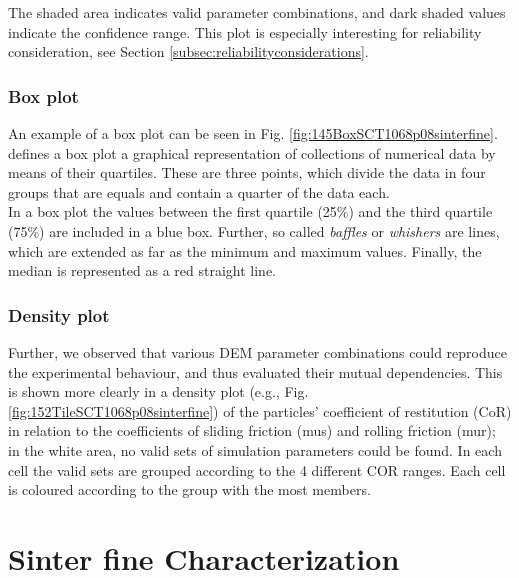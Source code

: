 The shaded area indicates valid parameter combinations, and dark shaded
values indicate the confidence range.
This plot is especially interesting for reliability consideration, see Section
\ref{subsec:reliabilityconsiderations}.




\subsubsection{Box plot}
\label{subsubsec:boxplot}
  
An example of a box plot can be seen
in Fig. \ref{fig:145BoxSCT1068p08sinterfine}.
\citet{RefWorks:207} defines a box plot a graphical representation of
collections of numerical data by means of their quartiles.
These are three points, which divide the data in four groups that are equals and
contain a quarter of the data each.\\
In a box plot the values between the first quartile (25\%) and the third
quartile (75\%) are included in a blue box.
Further, so called \textit{baffles} or \textit{whishers} are lines, which are
extended as far as the minimum and maximum values.
Finally, the median is represented as a red straight line.



\subsubsection{Density plot}
\label{subsubsec:densityplot}

Further, we observed that various \acs{DEM} parameter
combinations could reproduce the experimental behaviour, and thus evaluated
their mutual dependencies.
This is shown more clearly in a density plot (e.g., Fig. 
\ref{fig:152TileSCT1068p08sinterfine}) 
of the particles' coefficient of restitution (\acs{CoR}) in relation to
the coefficients of sliding friction (\acs{mus}) and rolling friction (\acs{mur}); 
in the white area, no valid sets of simulation parameters could be found.
In each cell the valid sets are grouped according to the 4 different COR
ranges.
Each cell is coloured according to the group with the most members.




\section{Sinter fine Characterization}
\label{sec:sinterfinecharacterization}

